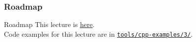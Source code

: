 \documentclass[aspectratio=169]{beamer}
\begin{document}
\frame{\titlepage}

\begin{frame}
  \frametitle{Roadmap}
  \tableofcontents
\end{frame}

\begin{frame}{Roadmap}
  This lecture is \href{https://github.com/robmasocco/DAFN26_Robotics_4}{\color{blue}\underline{here}}.\\
  \bigskip
  Code examples for this lecture are in \href{https://github.com/IntelligentSystemsLabUTV/ros2-examples/tree/jazzy/tools/cpp-examples/3}{\color{blue}\underline{\texttt{tools/cpp-examples/3/}}}.
\end{frame}












\end{document}

